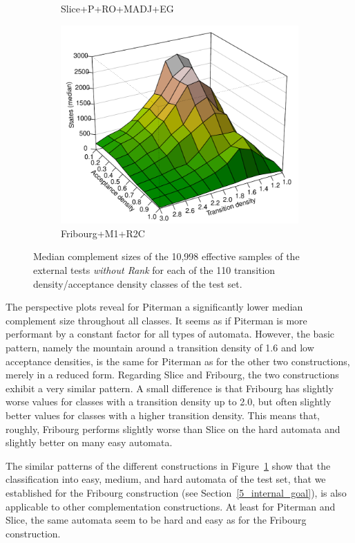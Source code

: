 \begin{figure}[ht]
\begin{subfigure}[t]{\perspwidth\textwidth}
  \caption{Slice+P+RO+MADJ+EG}
  \end{subfigure}
  \hfill
  \begin{subfigure}[t]{\perspwidth\textwidth}
  \centering
  \includegraphics[width=\textwidth]{../results/figures/external/goal/s.median.Fribourg+M1+R2C.pdf}
  \caption{Fribourg+M1+R2C}
  \end{subfigure}
  \hfill
\caption{Median complement sizes of the 10,998 effective samples of the external tests \textit{without Rank} for each of the 110 transition density/acceptance density classes of the \goal{} test set.}
\label{e.g.persp}
\end{figure}

The perspective plots reveal for Piterman a significantly lower median complement size throughout all classes. It seems as if Piterman is more performant by a constant factor for all types of automata. However, the basic pattern, namely the mountain around a transition density of 1.6 and low acceptance densities, is the same for Piterman as for the other two constructions, merely in a reduced form. Regarding Slice and Fribourg, the two constructions exhibit a very similar pattern. A small difference is that Fribourg has slightly worse values for classes with a transition density up to 2.0, but often slightly better values for classes with a higher transition density. This means that, roughly, Fribourg performs slightly worse than Slice on the hard automata and slightly better on many easy automata.

The similar patterns of the different constructions in Figure~\ref{e.g.persp} show that the classification into easy, medium, and hard automata of the \goal{} test set, that we established for the Fribourg construction (see Section~\ref{5_internal_goal}), is also applicable to other complementation constructions. At least for Piterman and Slice, the same automata seem to be hard and easy as for the Fribourg construction.

